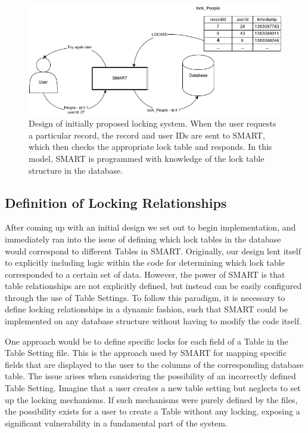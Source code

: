 \documentclass[12pt]{article}
\begin{document}
\begin{center}
\begin{figure}[h]
    \centering
    \centerline{\includegraphics[width=7in]{diagrams/InitialLockDesign.png}}
    \begin{spacing}{1.0}\caption{Design of initially proposed locking system. When the user requests a particular record, the record and user IDs are sent to SMART, which then checks the appropriate lock table and responds. In this model, SMART is programmed with knowledge of the lock table structure in the database.}\end{spacing}
\end{figure}
\end{center}

\subsection{Definition of Locking Relationships}

After coming up with an initial design we set out to begin implementation, and immediately ran into the issue of defining which lock tables in the database would correspond to different Tables in SMART. Originally, our design lent itself to explicitly including logic within the code for determining which lock table corresponded to a certain set of data. However, the power of SMART is that table relationships are not explicitly defined, but instead can be easily configured through the use of Table Settings. To follow this paradigm, it is necessary to define locking relationships in a dynamic fashion, such that SMART could be implemented on any database structure without having to modify the code itself.

One approach would be to define specific locks for each field of a Table in the Table Setting file. This is the approach used by SMART for mapping specific fields that are displayed to the user to the columns of the corresponding database table. The issue arises when considering the possibility of an incorrectly defined Table Setting. Imagine that a user creates a new table setting but neglects to set up the locking mechanisms. If such mechanisms were purely defined by the files, the possibility exists for a user to create a Table without any locking, exposing a significant vulnerability in a fundamental part of the system.
\end{document}

